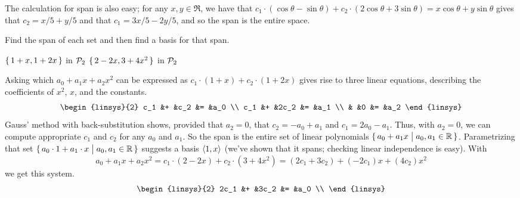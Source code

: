 \begin{exercises}
\begin{answer}
      The calculation for span is also easy; for any $x,y\in\Re$, 
      we have that 
      \( c_1\cdot(\cos\theta-\sin\theta)+c_2\cdot(2\cos\theta+3\sin\theta)=
        x\cos\theta+y\sin\theta \)
      gives that \( c_2=x/5+y/5 \) and that \( c_1=3x/5-2y/5 \),
      and so the span is the entire space.  
    \end{answer}
  \recommended \item 
    Find the span of each set and then find a basis for that span.
    \begin{exparts*}
       \partsitem $\mbox{$\{\,1+x,1+2x\,\}$}$ in $\mathcal{P}_2$
       \partsitem $\mbox{$\{\,2-2x,3+4x^2\,\}$}$ in $\mathcal{P}_2$
    \end{exparts*}
    \begin{answer}
      \begin{exparts}
         \partsitem Asking which $a_0+a_1x+a_2x^2$ can be expressed as
           $c_1\cdot (1+x)+c_2\cdot (1+2x)$ 
           gives rise to three linear equations,
           describing the coefficients of $x^2$, $x$, and the constants.
           \begin{equation*} 
             \begin{linsys}{2}
               c_1 &+ &c_2  &= &a_0 \\
               c_1 &+ &2c_2 &= &a_1 \\
                   &  &0    &= &a_2
             \end{linsys}
           \end{equation*}
           Gauss' method with back-substitution shows, 
           provided that $a_2=0$, that $c_2=-a_0+a_1$
           and $c_1=2a_0-a_1$.
           Thus, with $a_2=0$, we can compute appropriate
           $c_1$ and $c_2$ for any $a_0$ and $a_1$.
           So the span is the entire set of linear polynomials
           $\mbox{$\{\,a_0+a_1x\bigm| a_0,a_1\in\mathbb{R}\,\}$}$.
           Parametrizing that set 
           $\mbox{$\{\,a_0\cdot 1+a_1\cdot x\bigm| a_0,a_1\in\mathbb{R}\,\}$}$
           suggests a basis $\langle1,x\rangle$ 
           (we've shown that it spans; checking linear independence is easy). 
        \partsitem With
          \begin{equation*}
            a_0+a_1x+a_2x^2
            =c_1\cdot(2-2x)+c_2\cdot(3+4x^2)
            =(2c_1+3c_2)+(-2c_1)x+(4c_2)x^2
          \end{equation*}
          we get this system.
           \begin{equation*} 
             \begin{linsys}{2}
               2c_1  &+ &3c_2  &= &a_0 \\

\end{linsys}
\end{equation*}
\end{exparts}
\end{answer}
\end{exercises}
